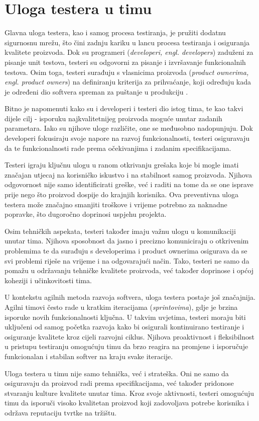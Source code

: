 \section{Uloga testera u timu}
Glavna uloga testera, kao i samog procesa testiranja, je pružiti dodatnu sigurnosnu mrežu, što čini zadnju kariku u lancu procesa testiranja i osiguranja kvalitete proizvoda.
Dok su programeri (\textit{developeri, engl. developers}) zaduženi za pisanje unit testova, testeri su odgovorni za pisanje i izvršavanje funkcionalnih testova.
Osim toga, testeri surađuju s vlasnicima proizvoda (\textit{product ownerima, engl. product owners}) na definiranju kriterija za prihvaćanje, koji određuju kada je određeni dio softvera spreman za puštanje u produkciju \cite{mundra2013practical}.

Bitno je napomenuti kako su i developeri i testeri dio istog tima, te kao takvi dijele cilj - isporuku najkvalitetnijeg proizvoda moguće unutar zadanih parametara.
Iako su njihove uloge različite, one se međusobno nadopunjuju.
Dok developeri fokusiraju svoje napore na razvoj funkcionalnosti, testeri osiguravaju da te funkcionalnosti rade prema očekivanjima i zadanim specifikacijama.

Testeri igraju ključnu ulogu u ranom otkrivanju grešaka koje bi mogle imati značajan utjecaj na korisničko iskustvo i na stabilnost samog proizvoda.
Njihova odgovornost nije samo identificirati greške, već i raditi na tome da se one isprave prije nego što proizvod dospije do krajnjih korisnika.
Ova preventivna uloga testera može značajno smanjiti troškove i vrijeme potrebno za naknadne popravke, što dugoročno doprinosi uspjehu projekta.

Osim tehničkih aspekata, testeri također imaju važnu ulogu u komunikaciji unutar tima.
Njihova sposobnost da jasno i precizno komuniciraju o otkrivenim problemima te da surađuju s developerima i product ownerima osigurava da se svi problemi riješe na vrijeme i na odgovarajući način.
Tako, testeri ne samo da pomažu u održavanju tehničke kvalitete proizvoda, već također doprinose i općoj koheziji i učinkovitosti tima.

U kontekstu agilnih metoda razvoja softvera, uloga testera postaje još značajnija.
Agilni timovi često rade u kratkim iteracijama (\textit{sprintovima}), gdje je brzina isporuke novih funkcionalnosti ključna.
U takvim uvjetima, testeri moraju biti uključeni od samog početka razvoja kako bi osigurali kontinuirano testiranje i osiguranje kvalitete kroz cijeli razvojni ciklus.
Njihova proaktivnost i fleksibilnost u pristupu testiranju omogućuju timu da brzo reagira na promjene i isporučuje funkcionalan i stabilan softver na kraju svake iteracije.

Uloga testera u timu nije samo tehnička, već i strateška.
Oni ne samo da osiguravaju da proizvod radi prema specifikacijama, već također pridonose stvaranju kulture kvalitete unutar tima.
Kroz svoje aktivnosti, testeri omogućuju timu da isporuči visoko kvalitetan proizvod koji zadovoljava potrebe korisnika i održava reputaciju tvrtke na tržištu.